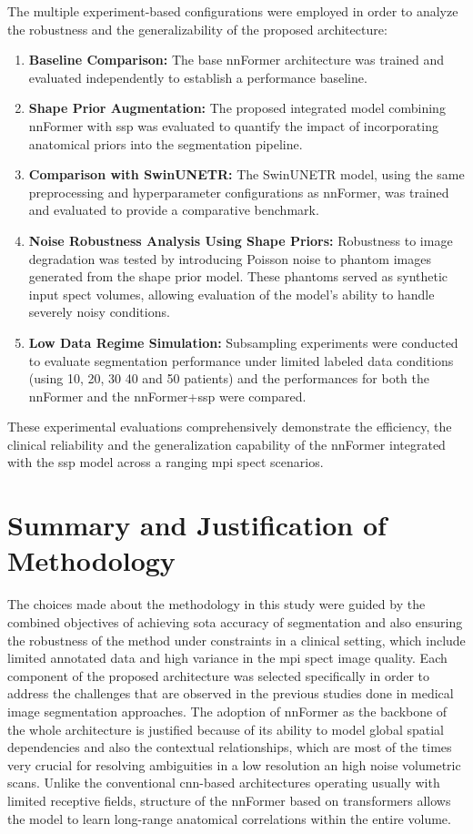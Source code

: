The multiple experiment-based configurations were employed in order to analyze the robustness and the generalizability of the proposed architecture:

\begin{enumerate}
\item \textbf{Baseline Comparison:} The base nnFormer architecture was trained and evaluated independently to establish a performance baseline.
\item \textbf{Shape Prior Augmentation:} The proposed integrated model combining nnFormer with \gls{ssp} was evaluated to quantify the impact of incorporating anatomical priors into the segmentation pipeline.
\item \textbf{Comparison with SwinUNETR:} The SwinUNETR model, using the same preprocessing and hyperparameter configurations as nnFormer, was trained and evaluated to provide a comparative benchmark.
\item \textbf{Noise Robustness Analysis Using Shape Priors:} Robustness to image degradation was tested by introducing Poisson noise to phantom images generated from the shape prior model. These phantoms served as synthetic input \gls{spect} volumes, allowing evaluation of the model's ability to handle severely noisy conditions.

\item \textbf{Low Data Regime Simulation:} Subsampling experiments were conducted to evaluate segmentation performance under limited labeled data conditions (using 10, 20, 30 40 and 50 patients) and the performances for both the nnFormer and the nnFormer+\gls{ssp} were compared.

\end{enumerate}

These experimental evaluations comprehensively demonstrate the efficiency, the clinical reliability and the generalization capability of the nnFormer integrated with the \gls{ssp} model across a ranging \gls{mpi} \gls{spect} scenarios.

\section{Summary and Justification of Methodology}
The choices made about the methodology in this study were guided by the combined objectives of achieving \gls{sota} accuracy of segmentation and also ensuring the robustness of the method under constraints in a clinical setting, which include limited annotated data and high variance in the \gls{mpi} \gls{spect} image quality. Each component of the proposed architecture was selected specifically in order to address the challenges that are observed in the previous studies done in medical image segmentation approaches. The adoption of nnFormer as the backbone of the whole architecture is justified because of its ability to model global spatial dependencies and also the contextual relationships, which are most of the times very crucial for resolving ambiguities in a low resolution an high noise volumetric scans. Unlike the conventional \gls{cnn}-based architectures operating usually with limited receptive fields, structure of the nnFormer based on transformers allows the model to learn long-range anatomical correlations within the entire volume.

